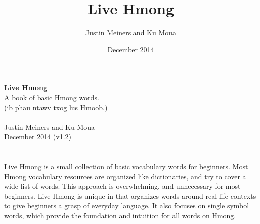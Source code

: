 \documentclass{article}
\title{Live Hmong}
\author{Justin Meiners and Ku Moua}
\date{December 2014}
\begin{document}
\begin{titlepage}
\begin{center}
\setlength\fboxsep{0pt}
\setlength\fboxrule{0.0pt}

\textbf{Live Hmong} \\
\large A book of basic Hmong words. \\
(ib phau ntawv txog lus Hmoob.) \\
~ \\
Justin Meiners and Ku Moua \\
December 2014 (v1.2) \\

\end{center}
\end{titlepage}

\section*{}
Live Hmong is a small collection of basic vocabulary words for beginners.
Most Hmong vocabulary resources are organized like dictionaries, and try to cover a wide list of words. This approach is overwhelming, and unnecessary for most beginners.
Live Hmong is unique in that organizes words around real life contexts to give beginners a grasp of everyday language.
It also focuses on single symbol words, which provide the foundation and intuition for all words on Hmong.
\end{document}
